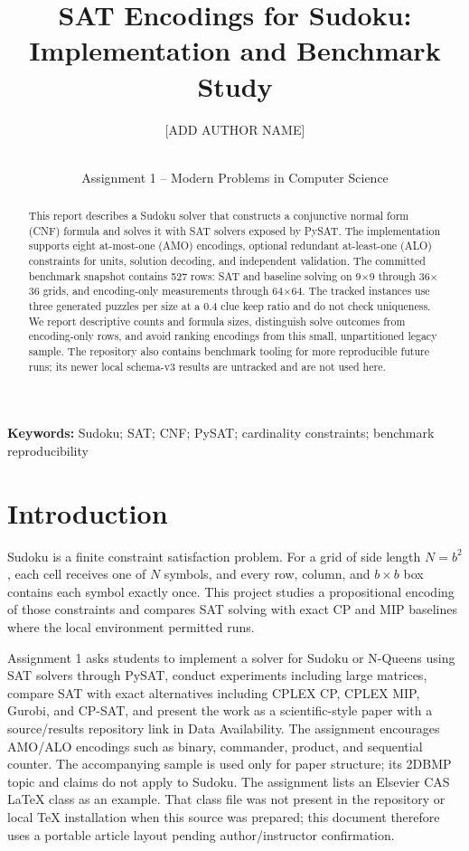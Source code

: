 \IfFileExists{cas-sc.cls}{\documentclass[a4paper,fleqn]{cas-sc}}{\documentclass[a4paper,11pt]{article}}
\title{SAT Encodings for Sudoku: Implementation and Benchmark Study}
\author{[ADD AUTHOR NAME]\\[ADD STUDENT ID]\\[ADD AFFILIATION]}
\date{Assignment 1 -- Modern Problems in Computer Science}
\begin{document}
\maketitle

\begin{abstract}
This report describes a Sudoku solver that constructs a conjunctive normal form (CNF) formula and solves it with SAT solvers exposed by PySAT. The implementation supports eight at-most-one (AMO) encodings, optional redundant at-least-one (ALO) constraints for units, solution decoding, and independent validation. The committed benchmark snapshot contains 527 rows: SAT and baseline solving on 9$\times$9 through 36$\times$36 grids, and encoding-only measurements through 64$\times$64. The tracked instances use three generated puzzles per size at a 0.4 clue keep ratio and do not check uniqueness. We report descriptive counts and formula sizes, distinguish solve outcomes from encoding-only rows, and avoid ranking encodings from this small, unpartitioned legacy sample. The repository also contains benchmark tooling for more reproducible future runs; its newer local schema-v3 results are untracked and are not used here.
\end{abstract}

\textbf{Keywords:} Sudoku; SAT; CNF; PySAT; cardinality constraints; benchmark reproducibility

\section{Introduction}
Sudoku is a finite constraint satisfaction problem. For a grid of side length $N=b^2$, each cell receives one of $N$ symbols, and every row, column, and $b\times b$ box contains each symbol exactly once. This project studies a propositional encoding of those constraints and compares SAT solving with exact CP and MIP baselines where the local environment permitted runs.

Assignment 1 asks students to implement a solver for Sudoku or N-Queens using SAT solvers through PySAT, conduct experiments including large matrices, compare SAT with exact alternatives including CPLEX CP, CPLEX MIP, Gurobi, and CP-SAT, and present the work as a scientific-style paper with a source/results repository link in Data Availability. The assignment encourages AMO/ALO encodings such as binary, commander, product, and sequential counter. The accompanying sample is used only for paper structure; its 2DBMP topic and claims do not apply to Sudoku. The assignment lists an Elsevier CAS LaTeX class as an example. That class file was not present in the repository or local TeX installation when this source was prepared; this document therefore uses a portable article layout pending author/instructor confirmation.
\end{document}
